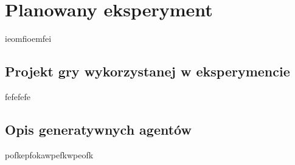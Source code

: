 \chapter{Planowany eksperyment}\label{chapter:ch4}

ieomfioemfei

\section{Projekt gry wykorzystanej w eksperymencie}\label{section:ch4_1}

fefefefe

\section{Opis generatywnych agentów}\label{section:ch4_2}

pofkepfokawpefkwpeofk